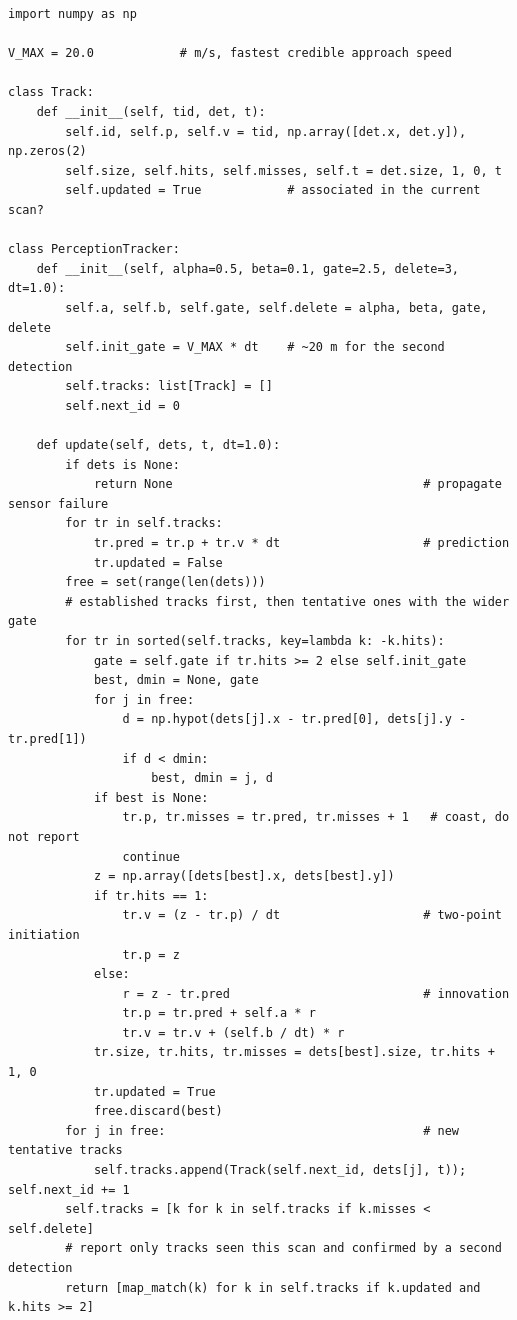 \begin{lstlisting}[style=py,caption={Two-point track initiation, $\alpha$--$\beta$ filtering, and withholding of coasting tracks},label={lst:app-tracker}]
import numpy as np

V_MAX = 20.0            # m/s, fastest credible approach speed

class Track:
    def __init__(self, tid, det, t):
        self.id, self.p, self.v = tid, np.array([det.x, det.y]), np.zeros(2)
        self.size, self.hits, self.misses, self.t = det.size, 1, 0, t
        self.updated = True            # associated in the current scan?

class PerceptionTracker:
    def __init__(self, alpha=0.5, beta=0.1, gate=2.5, delete=3, dt=1.0):
        self.a, self.b, self.gate, self.delete = alpha, beta, gate, delete
        self.init_gate = V_MAX * dt    # ~20 m for the second detection
        self.tracks: list[Track] = []
        self.next_id = 0

    def update(self, dets, t, dt=1.0):
        if dets is None:
            return None                                   # propagate sensor failure
        for tr in self.tracks:
            tr.pred = tr.p + tr.v * dt                    # prediction
            tr.updated = False
        free = set(range(len(dets)))
        # established tracks first, then tentative ones with the wider gate
        for tr in sorted(self.tracks, key=lambda k: -k.hits):
            gate = self.gate if tr.hits >= 2 else self.init_gate
            best, dmin = None, gate
            for j in free:
                d = np.hypot(dets[j].x - tr.pred[0], dets[j].y - tr.pred[1])
                if d < dmin:
                    best, dmin = j, d
            if best is None:
                tr.p, tr.misses = tr.pred, tr.misses + 1   # coast, do not report
                continue
            z = np.array([dets[best].x, dets[best].y])
            if tr.hits == 1:
                tr.v = (z - tr.p) / dt                    # two-point initiation
                tr.p = z
            else:
                r = z - tr.pred                           # innovation
                tr.p = tr.pred + self.a * r
                tr.v = tr.v + (self.b / dt) * r
            tr.size, tr.hits, tr.misses = dets[best].size, tr.hits + 1, 0
            tr.updated = True
            free.discard(best)
        for j in free:                                    # new tentative tracks
            self.tracks.append(Track(self.next_id, dets[j], t)); self.next_id += 1
        self.tracks = [k for k in self.tracks if k.misses < self.delete]
        # report only tracks seen this scan and confirmed by a second detection
        return [map_match(k) for k in self.tracks if k.updated and k.hits >= 2]
\end{lstlisting}

